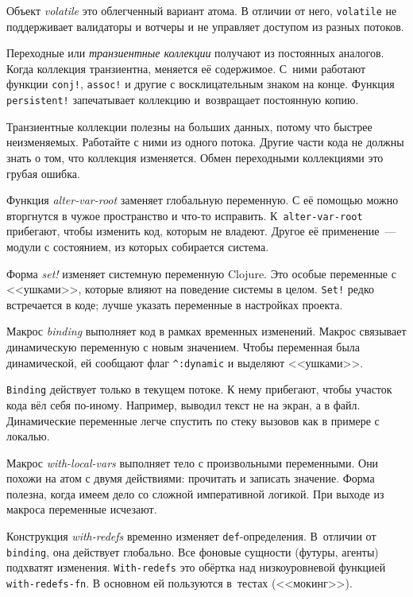 Объект \emph{volatile} это облегченный вариант атома. В отличии от него,
\verb|volatile| не поддерживает валидаторы и вотчеры и не управляет доступом
из разных потоков.

Переходные или \emph{транзиентные коллекции} получают из постоянных
аналогов. Когда коллекция транзиентна, меняется её содержимое. С~ними
работают функции \verb|conj!|, \verb|assoc!| и другие с восклицательным
знаком на конце. Функция \verb|persistent!| запечатывает коллекцию
и~возвращает постоянную копию.

Транзиентные коллекции полезны на больших данных, потому что быстрее
неизменяемых. Работайте с ними из одного потока. Другие части кода не должны
знать о том, что коллекция изменяется. Обмен переходными коллекциями это грубая
ошибка.

Функция \emph{alter-var-root} заменяет глобальную переменную. С её помощью можно
вторгнутся в чужое пространство и что-то исправить. К~\verb|alter-var-root|
прибегают, чтобы изменить код, которым не владеют. Другое её применение~---
модули с состоянием, из которых собирается система.

Форма \emph{set!} изменяет системную переменную Clojure. Это особые переменные с
<<ушками>>, которые влияют на поведение системы в целом. \verb|Set!| редко
встречается в коде; лучше указать переменные в настройках проекта.

Макрос \emph{binding} выполняет код в рамках временных изменений. Макрос
связывает динамическую переменную с новым значением. Чтобы переменная была
динамической, ей сообщают флаг \verb|^:dynamic| и выделяют <<ушками>>.

\verb|Binding| действует только в текущем потоке. К нему прибегают, чтобы
участок кода вёл себя по-иному. Например, выводил текст не на экран, а в
файл. Динамические переменные легче спустить по стеку вызовов как в примере с
локалью.

Макрос \emph{with-local-vars} выполняет тело с произвольными переменными. Они
похожи на атом с двумя действиями: прочитать и записать значение. Форма полезна,
когда имеем дело со сложной императивной логикой. При выходе из макроса
переменные исчезают.

Конструкция \emph{with-redefs} временно изменяет
\verb|def|-определения. В~отличии от \verb|binding|, она действует
глобально. Все фоновые сущности (футуры, агенты) подхватят
изменения. \verb|With-redefs| это обёртка над низкоуровневой функцией
\verb|with-redefs-fn|. В основном ей пользуются в~тестах (<<мокинг>>).
